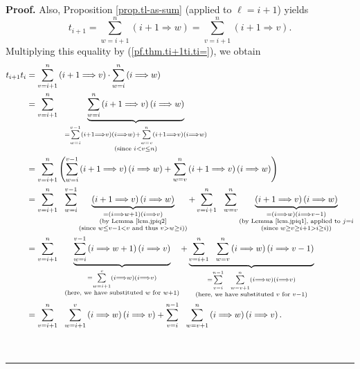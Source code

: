 \documentclass[numbers=enddot,12pt,final,onecolumn,notitlepage]{scrartcl}%
\theoremstyle{definition}
\newenvironment{proof}[1][Proof]{\noindent\textbf{#1.} }{\ \rule{0.5em}{0.5em}}
\let\sumnonlimits\sum
\renewcommand{\sum}{\sumnonlimits\limits}
\begin{document}
\begin{proof}
Also, Proposition \ref{prop.tl-as-sum} (applied to $\ell=i+1$) yields
\begin{equation}
t_{i+1}=\sum_{w=i+1}^{n}\left(  i+1\Longrightarrow w\right)  =\sum_{v=i+1}%
^{n}\left(  i+1\Longrightarrow v\right)  .\nonumber
\end{equation}
Multiplying this equality by (\ref{pf.thm.ti+1ti.ti=}), we obtain%
\begin{align*}
t_{i+1}t_{i}  &  =\sum_{v=i+1}^{n}\left(  i+1\Longrightarrow v\right)
\cdot\sum_{w=i}^{n}\left(  i\Longrightarrow w\right) \\
&  =\sum_{v=i+1}^{n}\ \ \underbrace{\sum_{w=i}^{n}\left(  i+1\Longrightarrow
v\right)  \left(  i\Longrightarrow w\right)  }_{\substack{=\sum_{w=i}%
^{v-1}\left(  i+1\Longrightarrow v\right)  \left(  i\Longrightarrow w\right)
+\sum_{w=v}^{n}\left(  i+1\Longrightarrow v\right)  \left(  i\Longrightarrow
w\right)  \\\text{(since }i<v\leq n\text{)}}}\\
&  =\sum_{v=i+1}^{n}\left(  \sum_{w=i}^{v-1}\left(  i+1\Longrightarrow
v\right)  \left(  i\Longrightarrow w\right)  +\sum_{w=v}^{n}\left(
i+1\Longrightarrow v\right)  \left(  i\Longrightarrow w\right)  \right) \\
&  =\sum_{v=i+1}^{n}\ \ \sum_{w=i}^{v-1}\underbrace{\left(  i+1\Longrightarrow
v\right)  \left(  i\Longrightarrow w\right)  }_{\substack{=\left(
i\Longrightarrow w+1\right)  \left(  i\Longrightarrow v\right)  \\\text{(by
Lemma \ref{lem.jpiq2}}\\\text{(since }w\leq v-1<v\text{ and thus }v>w\geq
i\text{))}}}+\sum_{v=i+1}^{n}\ \ \sum_{w=v}^{n}\underbrace{\left(
i+1\Longrightarrow v\right)  \left(  i\Longrightarrow w\right)  }%
_{\substack{=\left(  i\Longrightarrow w\right)  \left(  i\Longrightarrow
v-1\right)  \\\text{(by Lemma \ref{lem.jpiq1}, applied to }j=i\\\text{(since
}w\geq v\geq i+1>i\geq i\text{))}}}\\
&  =\sum_{v=i+1}^{n}\ \ \underbrace{\sum_{w=i}^{v-1}\left(  i\Longrightarrow
w+1\right)  \left(  i\Longrightarrow v\right)  }_{\substack{=\sum_{w=i+1}%
^{v}\left(  i\Longrightarrow w\right)  \left(  i\Longrightarrow v\right)
\\\text{(here, we have substituted }w\text{ for }w+1\text{)}}%
}+\underbrace{\sum_{v=i+1}^{n}\ \ \sum_{w=v}^{n}\left(  i\Longrightarrow
w\right)  \left(  i\Longrightarrow v-1\right)  }_{\substack{=\sum_{v=i}%
^{n-1}\ \ \sum_{w=v+1}^{n}\left(  i\Longrightarrow w\right)  \left(
i\Longrightarrow v\right)  \\\text{(here, we have substituted }v\text{ for
}v-1\text{)}}}\\
&  =\sum_{v=i+1}^{n}\ \ \sum_{w=i+1}^{v}\left(  i\Longrightarrow w\right)
\left(  i\Longrightarrow v\right)  +\sum_{v=i}^{n-1}\ \ \sum_{w=v+1}%
^{n}\left(  i\Longrightarrow w\right)  \left(  i\Longrightarrow v\right)  .
\end{align*}



\end{proof}
\end{document}
